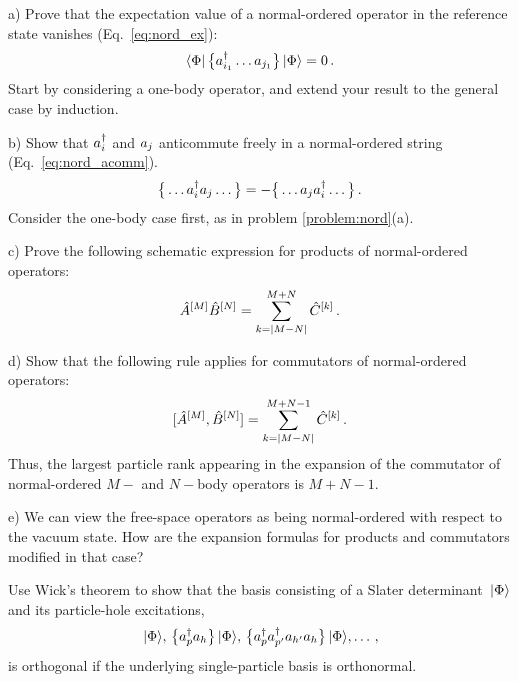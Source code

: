 {\begin{prob}\label{problem:nord}
  \item[a)] Prove that the expectation value of a normal-ordered operator in the
  reference state vanishes (Eq.~\eqref{eq:nord_ex}):
    \begin{equation}
      \langle{\Phi}|\,{\big\{a^\dag_{i_1}\ldots a_{j_1}\big\}}\,|{\Phi}\rangle = 0\,.
    \end{equation}
  Start by considering a one-body operator, and extend your result to the general
  case by induction.
  \item[b)] Show that $a^\dag_i$ and $a_j$ anticommute freely in a normal-ordered
  string (Eq.~\eqref{eq:nord_acomm}). 
  \begin{equation}
    \big\{\ldots a^\dag_ia_j\ldots\big\} = -\big\{\ldots a_ja^\dag_i\ldots\big\}\,.
  \end{equation}
  Consider the one-body case first, as in problem \ref{problem:nord}(a).
  \item[c)] Prove the following schematic expression for products of normal-ordered
  operators:
    \begin{equation}
      \hat{A}^{[M]}\hat{B}^{[N]} = \sum_{k=|M-N|}^{M+N}\hat{C}^{[k]}\,.
    \end{equation}
  \item[d)] Show that the following rule applies for commutators of normal-ordered
    operators:
    \begin{equation}
      [{\hat{A}^{[M]}},{\hat{B}^{[N]}}] = \sum_{k=|M-N|}^{M+N-1}\hat{C}^{[k]}\,.
    \end{equation}
    Thus, the largest particle rank appearing in the expansion of the commutator of 
    normal-ordered $M-$ and $N-$body operators is $M+N-1$.
  \item[e)] We can view the free-space operators as being normal-ordered with respect
    to the vacuum state. How are the expansion formulas for products and commutators
    modified in that case?
\end{prob}

\begin{prob}\label{problem:ph_orthogonality}
  Use Wick's theorem to show that the basis consisting of a Slater determinant $\,|{\Phi}\rangle$ 
  and its particle-hole excitations, 
  \begin{equation}
    \,|{\Phi}\rangle,\,\big\{a^\dag_{p}a_h\big\}\,|{\Phi}\rangle,\,\big\{a^\dag_{p}a^\dag_{p'}a_{h'}a_{h}\big\}\,|{\Phi}\rangle,\ldots\,,
  \end{equation}
  is orthogonal if the underlying single-particle basis is orthonormal.
\end{prob}

}
